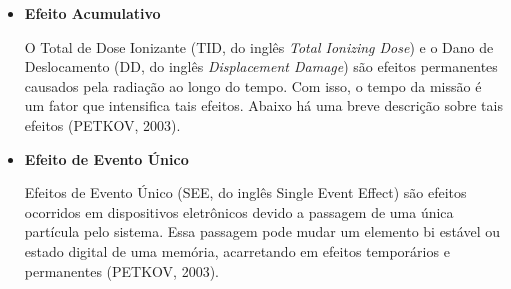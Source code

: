 \begin{itemize}
\item \textbf{Efeito Acumulativo}

O Total de Dose Ionizante (TID, do inglês \textit{Total Ionizing Dose}) e o Dano de Deslocamento (DD, do inglês \textit{Displacement Damage}) são efeitos permanentes causados pela radiação ao longo do tempo. Com isso, o tempo da missão é um fator que intensifica tais efeitos. Abaixo há uma breve descrição sobre tais efeitos (PETKOV, 2003).

\begin{table}[h]
\centering
\caption{Efeitos Acumulativos causada pela radiação espacial.}
\label{tabela2}
\end{table}

\newpage
\item \textbf{ Efeito de Evento Único}

Efeitos de Evento Único (SEE, do inglês Single Event Effect) são efeitos ocorridos em dispositivos eletrônicos devido a passagem de uma única partícula pelo sistema. Essa passagem pode mudar um elemento bi estável ou estado digital de uma memória, acarretando em efeitos temporários e permanentes (PETKOV, 2003).


\end{itemize}
